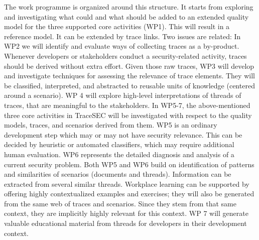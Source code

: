 The work programme is organized around this structure. It starts from exploring and investigating what could and what should be added to an extended quality model for the three supported core activities (WP1). This will result in a reference model. It can be extended by trace links. Two issues are related: In WP2 we will identify and evaluate ways of collecting traces as a by-product. Whenever developers or stakeholders conduct a security-related activity, traces should be derived without extra effort. Given those raw traces, WP3 will develop and investigate techniques for assessing the relevance of trace elements. They will be classified, interpreted, and abstracted to reusable units of knowledge (centered around a scenario). WP 4 will explore high-level interpretations of threads of traces, that are meaningful to the stakeholders. In WP5-7, the above-mentioned three core activities in TraceSEC will be investigated with respect to the quality models, traces, and scenarios derived from them. WP5 is an ordinary development step which may or may not have security relevance. This can be decided by heuristic or automated classifiers, which may require additional human evaluation. WP6 represents the detailed diagnosis and analysis of a current security problem. Both WP5 and WP6 build on identification of patterns and similarities of scenarios (documents and threads). Information can be extracted from several similar threads. Workplace learning can be supported by offering highly contextualized examples and exercises; they will also be generated from the same web of traces and scenarios. Since they stem from that same context, they are implicitly highly relevant for this context. WP 7 will generate valuable educational material from threads for developers in their development context.

